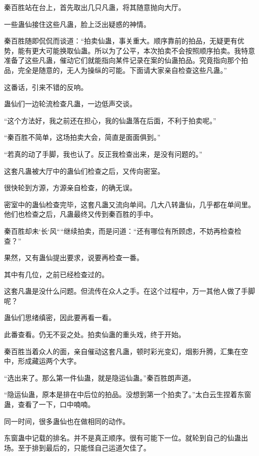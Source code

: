 
\begin{this_body}



秦百胜站在台上，首先取出几只凡蛊，将其随意抛向大厅。

一些蛊仙接住这些凡蛊，脸上泛出疑惑的神情。

秦百胜随即侃侃而谈道：“拍卖仙蛊，事关重大。顺序靠前的拍品，无疑更有优势，能有更大可能换取仙蛊。所以为了公平，本次拍卖不会按照顺序拍卖。我特意准备了这些凡蛊，催动它们就能指向某件记录在案的仙蛊拍品。究竟指向那个拍品，完全是随意的，无人为操纵的可能。下面请大家亲自检查这些凡蛊。”

这番话，引来不错的反响。

蛊仙们一边轮流检查凡蛊，一边低声交谈。

“这个方法好，我之前还在担心，我的仙蛊落在后面，不利于拍卖呢。”

“秦百胜不简单，这场拍卖大会，简直是面面俱到。”

“若真的动了手脚，我也认了。反正我检查出来，是没有问题的。”

这套凡蛊被大厅中的蛊仙们检查之后，又传向密室。

很快轮到方源，方源亲自检查，的确无误。

密室中的蛊仙检查完毕，这套凡蛊又流向单间。几大八转蛊仙，几乎都在单间里。他们也检查之后，凡蛊最终又传到秦百胜的手中。

秦百胜却未`长`风````继续拍卖，而是问道：“还有哪位有所顾虑，不妨再检查检查？”

果然，又有蛊仙提出要求，说要再检查一番。

其中有几位，之前已经检查过的。

这套凡蛊是没什么问题。但流传在众人之手。在这个过程中，万一其他人做了手脚呢？

蛊仙们思绪缜密，因此要再看一看。

此番查看。仍无不妥之处。拍卖仙蛊的重头戏，终于开始。

秦百胜当着众人的面，亲自催动这套凡蛊，顿时彩光变幻，烟影升腾，汇集在空中，形成藏运两个大字。

“选出来了。那么第一件仙蛊，就是隐运仙蛊。”秦百胜朗声道。

“隐运仙蛊，原本是排在中后位的拍品。没想到第一个拍卖了。”太白云生捏着东窗蛊，查看了一下，口中喃喃。

同一时间，很多蛊仙也在做相同的动作。

东窗蛊中记载的排名。并不是真正顺序。很有可能下一位。就轮到自己的仙蛊出场。至于排到最后的，只能怪自己运道欠佳了。


\end{this_body}
